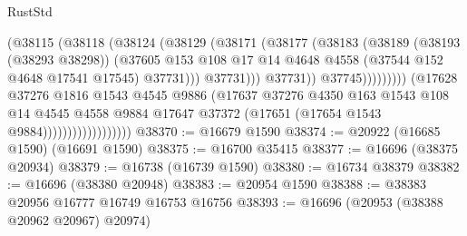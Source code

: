 \begin{lexlean}{RustStd}
\begin{coremodule}
                                                (@38115
                                                  (@38118
                                                    (@38124
                                                      (@38129
                                                        (@38171
                                                          (@38177
                                                            (@38183
                                                              (@38189
                                                                (@38193 (@38293 @38298))
                                                                (@37605
                                                                  @153
                                                                  @108
                                                                  @17
                                                                  @14
                                                                  @4648
                                                                  @4558
                                                                  (@37544 @152 @4648 @17541 @17545)
                                                                  @37731)))
                                                            @37731)))
                                                      @37731))
                                                  @37745)))))))))
                                (@17628
                                  @37276
                                  @1816
                                  @1543
                                  @4545
                                  @9886
                                  (@17637
                                    @37276
                                    @4350
                                    @163
                                    @1543
                                    @108
                                    @14
                                    @4545
                                    @4558
                                    @9884
                                    @17647
                                    @37372
                                    (@17651 (@17654 @1543 @9884))))))))))))))))))
@38370 := @16679 @1590
@38374 := @20922 (@16685 @1590) (@16691 @1590)
@38375 := @16700 @35415
@38377 := @16696 (@38375 @20934)
@38379 := @16738 (@16739 @1590)
@38380 := @16734 @38379
@38382 := @16696 (@38380 @20948)
@38383 := @20954 @1590
@38388 := @38383 @20956 @16777 @16749 @16753 @16756
@38393 := @16696 (@20953 (@38388 @20962 @20967) @20974)

\end{coremodule}
\end{lexlean}
